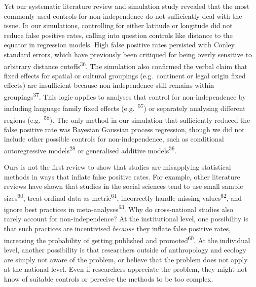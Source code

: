 \documentclass[
  english,
  man,floatsintext]{apa6}
\begin{document}
Yet our systematic literature review and simulation study revealed that the most commonly used controls for non-independence do not sufficiently deal with the issue. In our simulations, controlling for either latitude or longitude did not reduce false positive rates, calling into question controls like distance to the equator in regression models. High false positive rates persisted with Conley standard errors, which have previously been critiqued for being overly sensitive to arbitrary distance cutoffs\textsuperscript{36}. The simulation also confirmed the verbal claim that fixed effects for spatial or cultural groupings (e.g.~continent or legal origin fixed effects) are insufficient because non-independence still remains within groupings\textsuperscript{37}. This logic applies to analyses that control for non-independence by including language family fixed effects (e.g.~\textsuperscript{57}) or separately analysing different regions (e.g.~\textsuperscript{58}). The only method in our simulation that sufficiently reduced the false positive rate was Bayesian Gaussian process regression, though we did not include other possible controls for non-independence, such as conditional autoregressive models\textsuperscript{28} or generalised additive models\textsuperscript{59}.

Ours is not the first review to show that studies are misapplying statistical methods in ways that inflate false positive rates. For example, other literature reviews have shown that studies in the social sciences tend to use small sample sizes\textsuperscript{60}, treat ordinal data as metric\textsuperscript{61}, incorrectly handle missing values\textsuperscript{62}, and ignore best practices in meta-analyses\textsuperscript{63}. Why do cross-national studies also rarely account for non-independence? At the institutional level, one possibility is that such practices are incentivised \emph{because} they inflate false positive rates, increasing the probability of getting published and promoted\textsuperscript{60}. At the individual level, another possibility is that researchers outside of anthropology and ecology are simply not aware of the problem, or believe that the problem does not apply at the national level. Even if researchers appreciate the problem, they might not know of suitable controls or perceive the methods to be too complex.
\end{document}
